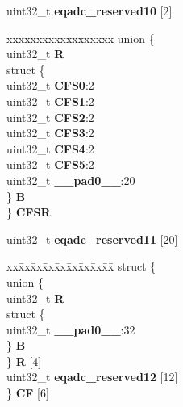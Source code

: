 \begin{DoxyCompactItemize}
\begin{tabbing}
\end{tabbing}\item 
\mbox{\label{structEQADC__tag_ae755dbaa6322a6e85c5574fa23d9d4d3}} 
uint32\+\_\+t {\bfseries eqadc\+\_\+reserved10} \mbox{[}2\mbox{]}
\item 
\mbox{\label{structEQADC__tag_a0eac5e8ea6c7812f13e3602e64342e47}} 
\begin{tabbing}
xx\=xx\=xx\=xx\=xx\=xx\=xx\=xx\=xx\=\kill
union \{\\
\>uint32\_t {\bfseries R}\\
\>struct \{\\
\>\>uint32\_t {\bfseries CFS0}:2\\
\>\>uint32\_t {\bfseries CFS1}:2\\
\>\>uint32\_t {\bfseries CFS2}:2\\
\>\>uint32\_t {\bfseries CFS3}:2\\
\>\>uint32\_t {\bfseries CFS4}:2\\
\>\>uint32\_t {\bfseries CFS5}:2\\
\>\>uint32\_t {\bfseries \_\_pad0\_\_}:20\\
\>\} {\bfseries B}\\
\} {\bfseries CFSR}\\

\end{tabbing}\item 
\mbox{\label{structEQADC__tag_aed24cfa89703618fc8a5a1a9e40d415b}} 
uint32\+\_\+t {\bfseries eqadc\+\_\+reserved11} \mbox{[}20\mbox{]}
\item 
\mbox{\label{structEQADC__tag_a467fbdb86f8e3e7fd816353e8aad4513}} 
\begin{tabbing}
xx\=xx\=xx\=xx\=xx\=xx\=xx\=xx\=xx\=\kill
struct \{\\
\>union \{\\
\>\>uint32\_t {\bfseries R}\\
\>\>struct \{\\
\>\>\>uint32\_t {\bfseries \_\_pad0\_\_}:32\\
\>\>\} {\bfseries B}\\
\>\} {\bfseries R} \mbox{[}4\mbox{]}\\
\>uint32\_t {\bfseries eqadc\_reserved12} \mbox{[}12\mbox{]}\\
\} {\bfseries CF} \mbox{[}6\mbox{]}\\


\end{tabbing}
\end{DoxyCompactItemize}
